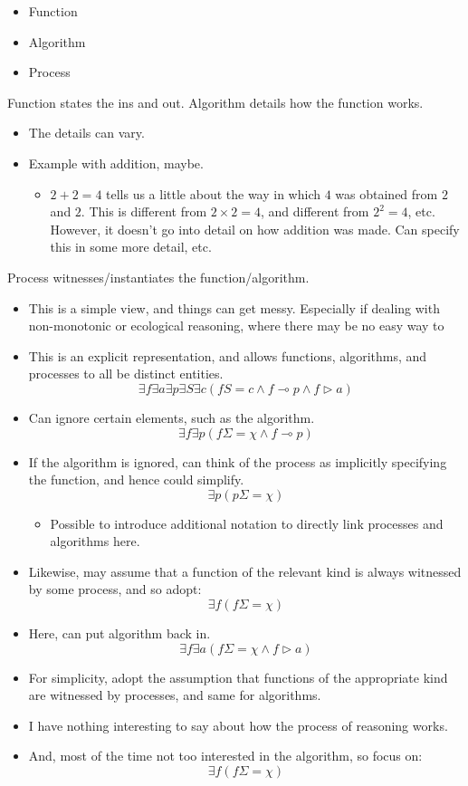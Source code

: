 \documentclass[10pt]{article}
\newcommand{\futin}{\ensuremath{\Sigma}}
\newcommand{\futout}{\ensuremath{\chi}}
\begin{document}
\begin{itemize}
\item Function
\item Algorithm
\item Process
\end{itemize}

Function states the ins and out.
Algorithm details how the function works.
\begin{itemize}
\item The details can vary.
\item Example with addition, maybe.
  \begin{itemize}
  \item \(2 + 2 = 4\) tells us a little about the way in which \(4\) was obtained from \(2\) and \(2\).
    This is different from \(2 \times 2 = 4\), and different from \(2^{2} = 4\), etc.
    However, it doesn't go into detail on how addition was made.
    Can specify this in some more detail, etc.\
  \end{itemize}
\end{itemize}
Process witnesses/instantiates the function/algorithm.

\begin{itemize}
\item This is a simple view, and things can get messy.
  Especially if dealing with non-monotonic or ecological reasoning, where there may be no easy way to 
\end{itemize}


\begin{itemize}
\item This is an explicit representation, and allows functions, algorithms, and processes to all be distinct entities.
  \[\exists f \exists a \exists p \exists S \exists c(fS = c \land f \multimap p \land f \triangleright a)\]
\item Can ignore certain elements, such as the algorithm.
  \[\exists f \exists p(f\futin = \futout \land f \multimap p)\]
\item If the algorithm is ignored, can think of the process as implicitly specifying the function, and hence could simplify.
  \[\exists p(p\futin = \futout)\]
  \begin{itemize}
  \item Possible to introduce additional notation to directly link processes and algorithms here.
  \end{itemize}
\item Likewise, may assume that a function of the relevant kind is always witnessed by some process, and so adopt:
  \[\exists f(f\futin = \futout)\]
\item Here, can put algorithm back in.
  \[\exists f \exists a(f\futin = \futout \land f \triangleright a)\]
\item For simplicity, adopt the assumption that functions of the appropriate kind are witnessed by processes, and same for algorithms.
\item I have nothing interesting to say about how the process of reasoning works.
\item And, most of the time not too interested in the algorithm, so focus on:
  \[\exists f(f\futin = \futout)\]
\end{itemize}
\end{document}
